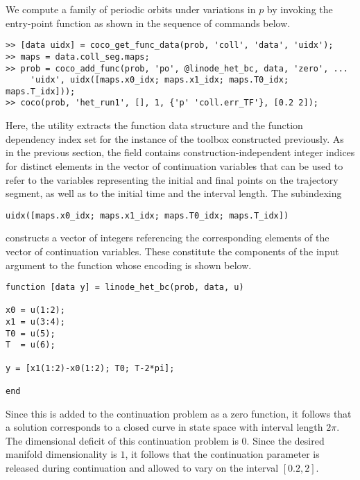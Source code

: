 We compute a family of periodic orbits under variations in $p$ by invoking the  entry-point function as shown in the sequence of commands below.
\begin{lstlisting}[language=coco-highlight]
>> [data uidx] = coco_get_func_data(prob, 'coll', 'data', 'uidx');
>> maps = data.coll_seg.maps;
>> prob = coco_add_func(prob, 'po', @linode_het_bc, data, 'zero', ...
     'uidx', uidx([maps.x0_idx; maps.x1_idx; maps.T0_idx; maps.T_idx]));
>> coco(prob, 'het_run1', [], 1, {'p' 'coll.err_TF'}, [0.2 2]);
\end{lstlisting}
Here, the  utility extracts the function data structure and the function dependency index set for the instance of the  toolbox constructed previously. As in the previous section, the  field contains construction-independent integer indices for distinct elements in the vector of continuation variables that  can be used to refer to the variables representing the initial and final points on the trajectory segment, as well as to the initial time and the interval length. The subindexing
\begin{lstlisting}[language=coco-highlight]
uidx([maps.x0_idx; maps.x1_idx; maps.T0_idx; maps.T_idx])
\end{lstlisting}
constructs a vector of integers referencing the corresponding elements of the vector of continuation variables. These constitute the components of the  input argument to the function  whose encoding is shown below.
\begin{lstlisting}[language=coco-highlight]
function [data y] = linode_het_bc(prob, data, u)

x0 = u(1:2);
x1 = u(3:4);
T0 = u(5);
T  = u(6);

y = [x1(1:2)-x0(1:2); T0; T-2*pi];

end
\end{lstlisting}
Since this is added to the continuation problem as a zero function, it follows that a solution corresponds to a closed curve in state space with interval length $2\pi$. The dimensional deficit of this continuation problem is $0$. Since the desired manifold dimensionality is $1$, it follows that the continuation parameter  is released during continuation and allowed to vary on the interval $[0.2,2]$.

